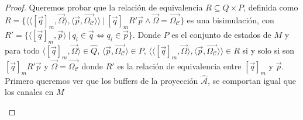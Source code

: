 \begin{proof}

Queremos probar que la relación de equivalencia $R \subseteq \hat{Q} \times P$, definida como $R = \{ \langle \langle [\overrightarrow{q}]_m, \overrightarrow{\Omega} \rangle, \langle \overrightarrow{p}, \overrightarrow{\Omega_{\mathcal{C}}} \rangle \rangle \ | \ [\overrightarrow{q}]_mR'\overrightarrow{p} \land  \overrightarrow{\Omega}=\overrightarrow{\Omega_{\mathcal{C}}} \}$ es una bisimulación, con $R'=\{\langle [\overrightarrow{q}]_m, \overrightarrow{p} \rangle \ | \ q_i \in \overrightarrow{q} \iff q_i \in \overrightarrow{p} \}$. Donde $P$ es el conjunto de estados de $M$ y para todo $\langle [\overrightarrow{q}]_m, \overrightarrow{\Omega} \rangle \in \hat{Q}$, $\langle \overrightarrow{p}, \overrightarrow{\Omega_{\mathcal{C}}} \rangle \in P$, $\langle \langle [\overrightarrow{q}]_m, \overrightarrow{\Omega} \rangle, \langle \overrightarrow{p}, \overrightarrow{\Omega_{\mathcal{C}}} \rangle \rangle \in R$ si y solo si son $[\overrightarrow{q}]_mR'\overrightarrow{p}$ y $\overrightarrow{\Omega}=\overrightarrow{\Omega_{\mathcal{C}}}$ donde $R'$ es la relación de equivalencia entre $[\overrightarrow{q}]_m$ y $\overrightarrow{p}$. \\

Primero queremos ver que los buffers de la proyección $\hat{\mathcal{A}}$, se comportan igual que los canales en $M$

\begin{itemize}
    
    

\end{itemize}
\end{proof}
